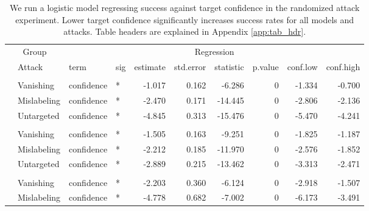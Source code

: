 \documentclass[
]{article}
\begin{document}
\begin{longtable}[t]{llllrrrrrr}
\caption{\label{tab:target_conf_table}We run a logistic model regressing success against target confidence in the randomized attack experiment. Lower target confidence significantly increases success rates for all models and attacks. Table headers are explained in Appendix \ref{app:tab_hdr}.}\\
\toprule
\multicolumn{2}{c}{Group} & \multicolumn{8}{c}{Regression} \\
\cmidrule(l{3pt}r{3pt}){1-2} \cmidrule(l{3pt}r{3pt}){3-10}
 & Attack & term & sig & estimate & std.error & statistic & p.value & conf.low & conf.high\\
\midrule
\addlinespace[0.3em]
\multicolumn{10}{l}{\textbf{YOLOv3}}\\
\hspace{1em} & Vanishing & confidence & * & -1.017 & 0.162 & -6.286 & 0 & -1.334 & -0.700\\
\cmidrule{2-10}\nopagebreak
\hspace{1em} & Mislabeling & confidence & * & -2.470 & 0.171 & -14.445 & 0 & -2.806 & -2.136\\
\cmidrule{2-10}\nopagebreak
\hspace{1em} & Untargeted & confidence & * & -4.845 & 0.313 & -15.476 & 0 & -5.470 & -4.241\\
\cmidrule{1-10}\pagebreak[0]
\addlinespace[0.3em]
\multicolumn{10}{l}{\textbf{SSD}}\\
\hspace{1em} & Vanishing & confidence & * & -1.505 & 0.163 & -9.251 & 0 & -1.825 & -1.187\\
\cmidrule{2-10}\nopagebreak
\hspace{1em} & Mislabeling & confidence & * & -2.212 & 0.185 & -11.970 & 0 & -2.576 & -1.852\\
\cmidrule{2-10}\nopagebreak
\hspace{1em} & Untargeted & confidence & * & -2.889 & 0.215 & -13.462 & 0 & -3.313 & -2.471\\
\cmidrule{1-10}\pagebreak[0]
\addlinespace[0.3em]
\multicolumn{10}{l}{\textbf{RetinaNet}}\\
\hspace{1em} & Vanishing & confidence & * & -2.203 & 0.360 & -6.124 & 0 & -2.918 & -1.507\\
\cmidrule{2-10}\nopagebreak
\hspace{1em} & Mislabeling & confidence & * & -4.778 & 0.682 & -7.002 & 0 & -6.173 & -3.491\\

\end{longtable}
\end{document}
